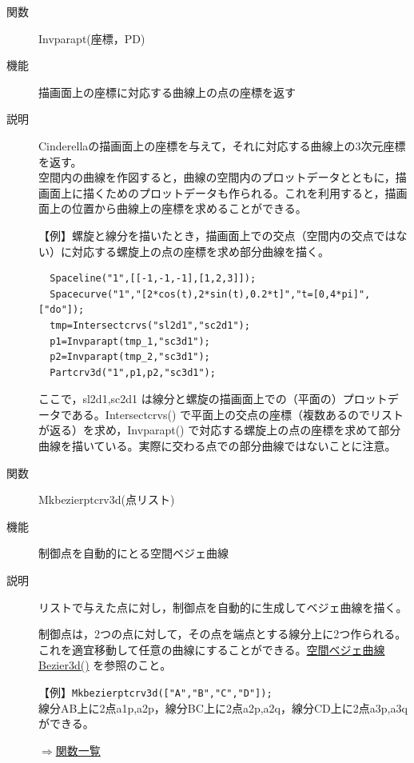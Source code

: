 \documentclass[papersize,a4paper,12pt,uplatex]{jsarticle}
\begin{document}
\begin{description}
\hypertarget{invparapt}{}
\item[関数]  Invparapt(座標，PD)
\item[機能]  描画面上の座標に対応する曲線上の点の座標を返す
\item[説明]  Cinderellaの描画面上の座標を与えて，それに対応する曲線上の3次元座標を返す。
\\
空間内の曲線を作図すると，曲線の空間内のプロットデータとともに，描画面上に描くためのプロットデータも作られる。これを利用すると，描画面上の位置から曲線上の座標を求めることができる。

\vspace{\baselineskip}
【例】螺旋と線分を描いたとき，描画面上での交点（空間内の交点ではない）に対応する螺旋上の点の座標を求め部分曲線を描く。

\begin{verbatim}
  Spaceline("1",[[-1,-1,-1],[1,2,3]]);
  Spacecurve("1","[2*cos(t),2*sin(t),0.2*t]","t=[0,4*pi]",["do"]);
  tmp=Intersectcrvs("sl2d1","sc2d1");
  p1=Invparapt(tmp_1,"sc3d1");
  p2=Invparapt(tmp_2,"sc3d1");
  Partcrv3d("1",p1,p2,"sc3d1"); 
\end{verbatim}
 \begin{center}  \end{center}
 
ここで，sl2d1,sc2d1 は線分と螺旋の描画面上での（平面の）プロットデータである。Intersectcrvs() で平面上の交点の座標（複数あるのでリストが返る）を求め，Invparapt() で対応する螺旋上の点の座標を求めて部分曲線を描いている。実際に交わる点での部分曲線ではないことに注意。

\vspace{\baselineskip}
\hypertarget{mkbezierptcrv3d}{}
\item[関数]  Mkbezierptcrv3d(点リスト)
\item[機能]  制御点を自動的にとる空間ベジェ曲線
\item[説明]  リストで与えた点に対し，制御点を自動的に生成してベジェ曲線を描く。

  制御点は，2つの点に対して，その点を端点とする線分上に2つ作られる。これを適宜移動して任意の曲線にすることができる。\hyperlink{bezier3d}{空間ベジェ曲線 Bezier3d()} を参照のこと。
  
\vspace{\baselineskip}
【例】\verb|Mkbezierptcrv3d(["A","B","C","D"]);|\\
    線分AB上に2点a1p,a2p，線分BC上に2点a2p,a2q，線分CD上に2点a3p,a3qができる。
    

\begin{flushright} \hyperlink{functionlist}{$\Rightarrow$関数一覧}\end{flushright}


\end{description}
\end{document}
